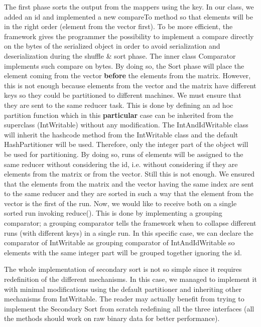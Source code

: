 \documentclass[a4paper,12pt]{article}
\begin{document}
The first phase sorts the output from the mappers using the key. 
In our class, we added an id and implemented a new compareTo method so that elements will be in the right order (element from the vector first).
To be more efficient, the framework gives the programmer the possibility to implement a compare directly on the bytes of the serialized object in order to avoid serialization and deserialization during the shuffle \& sort phase.
The inner class Comparator implements such compare on bytes.
By doing so, the Sort phase will place the element coming from the vector \textbf{before} the elements from the matrix.
However, this is not enough because elements from the vector and the matrix have different keys so they could be partitioned to different machines.
We must ensure that they are sent to the same reducer task.
This is done by defining an ad hoc partition function which in this \textbf{particular} case can be inherited from the superclass (IntWritable) without any modification. 
The IntAndIdWritable class will inherit the hashcode method from the IntWritable class and the default HashPartitioner will be used.
Therefore, only the integer part of the object will be used for partitioning.
By doing so, runs of elements will be assigned to the same reducer without considering the id, i.e. without considering if they are elements from the matrix or from the vector.
Still this is not enough. 
We ensured that the elements from the matrix and the vector having the same index are sent to the same reducer and they are sorted in such a way that the element from the vector is the first of the run. 
Now, we would like to receive both on a single sorted run invoking reduce().
This is done by implementing a grouping comparator; a grouping comparator tells the framework when to collapse different runs (with different keys) in a single run. 
In this specific case, we can declare the comparator of IntWritable as grouping comparator of IntAndIdWritable so elements with the same integer part will be grouped together ignoring the id.

The whole implementation of secondary sort is not so simple since it requires redefinition of the different mechanisms.
In this case, we managed to implement it with minimal modifications using the default partitioner and inheriting other mechanisms from IntWritable. 
The reader may actually benefit from trying to implement the Secondary Sort from scratch redefining all the three interfaces (all the methods should work on raw binary data for better performance).
\end{document}
